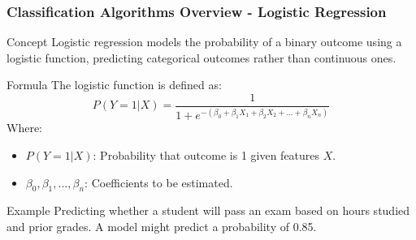 \documentclass[aspectratio=169]{beamer}
\begin{document}
\begin{frame}[fragile]
    \frametitle{Classification Algorithms Overview - Logistic Regression}
    \begin{block}{Concept}
        Logistic regression models the probability of a binary outcome using a logistic function, predicting categorical outcomes rather than continuous ones.
    \end{block}
    
    \begin{block}{Formula}
        The logistic function is defined as:
        \begin{equation}
            P(Y=1|X) = \frac{1}{1 + e^{-(\beta_0 + \beta_1 X_1 + \beta_2 X_2 + ... + \beta_n X_n)}}
        \end{equation}
        Where:
        \begin{itemize}
            \item $P(Y=1|X)$: Probability that outcome is 1 given features $X$.
            \item $\beta_0, \beta_1, ..., \beta_n$: Coefficients to be estimated.
        \end{itemize}
    \end{block}
    
    \begin{block}{Example}
        Predicting whether a student will pass an exam based on hours studied and prior grades. A model might predict a probability of 0.85.
    \end{block}
\end{frame}
\end{document}
